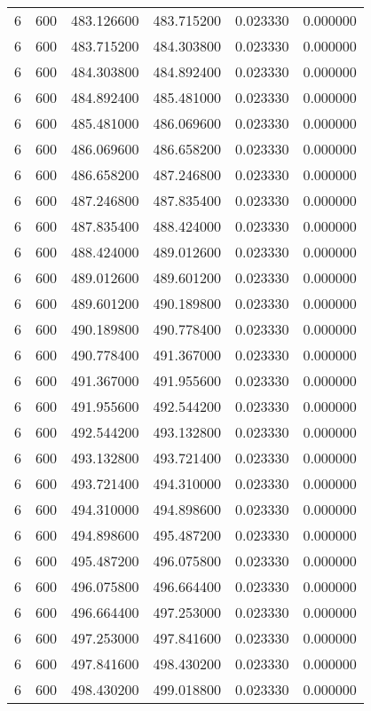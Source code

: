 \begin{longtable}{rrrrrr}
6 & 600 & 483.126600 & 483.715200 & 0.023330 & 0.000000 \\
6 & 600 & 483.715200 & 484.303800 & 0.023330 & 0.000000 \\
6 & 600 & 484.303800 & 484.892400 & 0.023330 & 0.000000 \\
6 & 600 & 484.892400 & 485.481000 & 0.023330 & 0.000000 \\
6 & 600 & 485.481000 & 486.069600 & 0.023330 & 0.000000 \\
6 & 600 & 486.069600 & 486.658200 & 0.023330 & 0.000000 \\
6 & 600 & 486.658200 & 487.246800 & 0.023330 & 0.000000 \\
6 & 600 & 487.246800 & 487.835400 & 0.023330 & 0.000000 \\
6 & 600 & 487.835400 & 488.424000 & 0.023330 & 0.000000 \\
6 & 600 & 488.424000 & 489.012600 & 0.023330 & 0.000000 \\
6 & 600 & 489.012600 & 489.601200 & 0.023330 & 0.000000 \\
6 & 600 & 489.601200 & 490.189800 & 0.023330 & 0.000000 \\
6 & 600 & 490.189800 & 490.778400 & 0.023330 & 0.000000 \\
6 & 600 & 490.778400 & 491.367000 & 0.023330 & 0.000000 \\
6 & 600 & 491.367000 & 491.955600 & 0.023330 & 0.000000 \\
6 & 600 & 491.955600 & 492.544200 & 0.023330 & 0.000000 \\
6 & 600 & 492.544200 & 493.132800 & 0.023330 & 0.000000 \\
6 & 600 & 493.132800 & 493.721400 & 0.023330 & 0.000000 \\
6 & 600 & 493.721400 & 494.310000 & 0.023330 & 0.000000 \\
6 & 600 & 494.310000 & 494.898600 & 0.023330 & 0.000000 \\
6 & 600 & 494.898600 & 495.487200 & 0.023330 & 0.000000 \\
6 & 600 & 495.487200 & 496.075800 & 0.023330 & 0.000000 \\
6 & 600 & 496.075800 & 496.664400 & 0.023330 & 0.000000 \\
6 & 600 & 496.664400 & 497.253000 & 0.023330 & 0.000000 \\
6 & 600 & 497.253000 & 497.841600 & 0.023330 & 0.000000 \\
6 & 600 & 497.841600 & 498.430200 & 0.023330 & 0.000000 \\
6 & 600 & 498.430200 & 499.018800 & 0.023330 & 0.000000 \\

\end{longtable}
